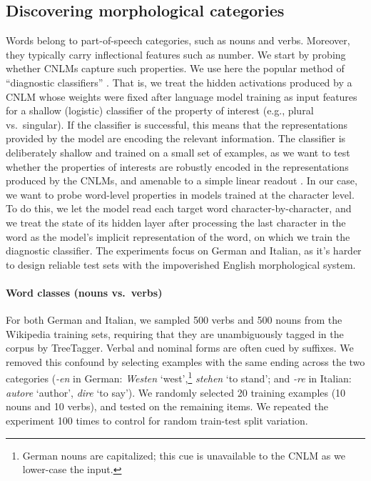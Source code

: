 \subsection{Discovering morphological categories}
\label{sec:categories}

Words belong to part-of-speech categories, such as nouns and
verbs. Moreover, they typically carry inflectional features such as
number. We start by probing whether CNLMs capture such
properties. We use here the popular method of ``diagnostic
classifiers'' \cite{Hupkes:etal:2017}. That is, we treat the hidden
activations produced by a CNLM whose weights were fixed after language
model training as input features for a shallow (logistic) classifier
of the property of interest (e.g., plural vs.~singular). If the
classifier is successful, this means that the representations provided
by the model are encoding the relevant information.  The classifier is
deliberately shallow and trained on a small set of examples, as we
want to test whether the properties of interests are robustly encoded
in the representations produced by the CNLMs, and amenable to a simple
linear readout \cite{Fusi:etal:2016}. In our case, we want to probe
word-level properties in models trained at the character level. To do
this, we let the model read each target word character-by-character,
and we treat the state of its hidden layer after processing the last
character in the word as the model's implicit representation of the
word, on which we train the diagnostic classifier. %
The experiments focus on German and Italian, as it's harder to design
reliable test sets with the impoverished English morphological system.

\paragraph{Word classes (nouns vs.~verbs)}

For both German and Italian, we sampled 500 verbs and 500 nouns from
the Wikipedia training sets, requiring that they are unambiguously
tagged in the corpus by TreeTagger. Verbal and nominal forms are often
cued by suffixes. We removed this confound by selecting examples with
the same ending across the two categories (\emph{-en} in German:
\emph{Westen} `west',\footnote{German nouns are capitalized; this cue
  is unavailable to the CNLM as we lower-case the input.} %
\emph{stehen} `to stand'; and \emph{-re} in Italian: \emph{autore}
`author', \emph{dire} `to say'). We randomly selected 20 training examples
(10 nouns and 10 verbs), and tested on the remaining items.  We
repeated the experiment 100 times to control for random train-test
split variation.


